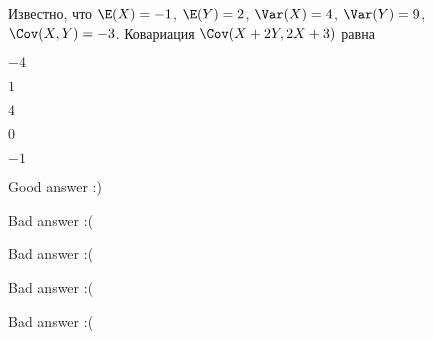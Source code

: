 
\begin{question}
Известно, что \(\E(X)=-1\), \(\E(Y)=2\), \(\Var(X)=4\), \(\Var(Y)=9\),
\(\Cov(X,Y)=-3\). Ковариация \(\Cov(X+2Y, 2X+3)\) равна
\begin{answerlist}
  \item \(-4\)
  \item \(1\)
  \item \(4\)
  \item \(0\)
  \item \(-1\)
\end{answerlist}
\end{question}

\begin{solution}
\begin{answerlist}
  \item Good answer :)
  \item Bad answer :(
  \item Bad answer :(
  \item Bad answer :(
  \item Bad answer :(
\end{answerlist}
\end{solution}

